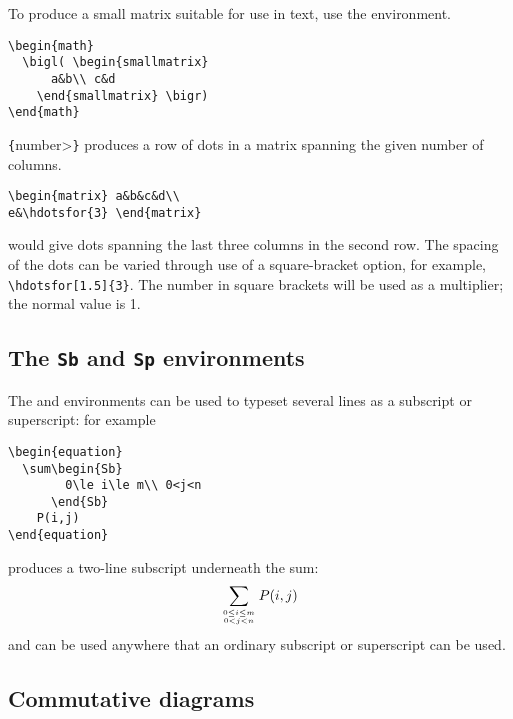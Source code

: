 To produce a small matrix suitable for use in text, use the
 environment.
\begin{verbatim}
\begin{math}
  \bigl( \begin{smallmatrix}
      a&b\\ c&d
    \end{smallmatrix} \bigr)
\end{math}
\end{verbatim}

\verb"{"\<number>\verb"}" produces a row of dots in a matrix
spanning the given number of columns.
\begin{verbatim}
\begin{matrix} a&b&c&d\\
e&\hdotsfor{3} \end{matrix}
\end{verbatim}
would give dots spanning the last three columns in the second row.
The spacing of the dots can be varied through use of a square-bracket
option, for example, \verb"\hdotsfor[1.5]{3}".  The number in square brackets
will be used as a multiplier; the normal value is 1.

\subsection{The {\tt Sb} and {\tt Sp} environments}

The  and  environments can be used to typeset several
lines as a subscript or superscript:
for example
\begin{verbatim}
\begin{equation}
  \sum\begin{Sb}
        0\le i\le m\\ 0<j<n
      \end{Sb}
    P(i,j)
\end{equation}
\end{verbatim}
produces a two-line subscript underneath the sum:
\begin{equation}
  \sum_{0\le i\le m\atop 0<j<n}
    P(i,j)
\end{equation}
 and  can be used anywhere that an ordinary subscript or
superscript can be used.

\subsection{Commutative diagrams}
\label{s:commdiag}

